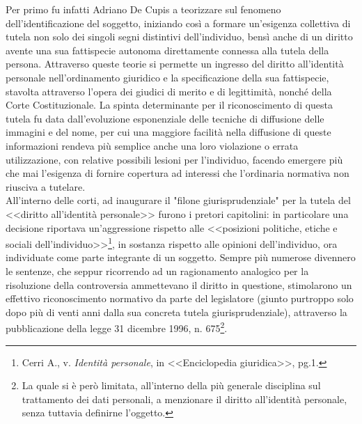 Per primo fu infatti Adriano De Cupis a teorizzare sul fenomeno dell'identificazione del soggetto, iniziando così a formare un’esigenza collettiva di tutela non solo dei singoli segni distintivi dell'individuo, bensì anche di un diritto avente una sua fattispecie autonoma direttamente connessa alla tutela della persona. Attraverso queste teorie si permette un ingresso del diritto all’identità personale nell’ordinamento giuridico e la specificazione della sua fattispecie, stavolta attraverso l’opera dei giudici di merito e di legittimità, nonché della Corte Costituzionale. 
La spinta determinante per il riconoscimento di questa tutela fu data dall’evoluzione esponenziale delle tecniche di diffusione  delle immagini e del nome, per cui una maggiore facilità nella diffusione di queste informazioni rendeva più semplice anche una loro violazione o errata utilizzazione, con relative possibili lesioni per l'individuo, facendo emergere più che mai l’esigenza di fornire copertura ad interessi che l’ordinaria normativa non riusciva a tutelare.
\\All'interno delle corti, ad inaugurare il "filone giurisprudenziale" per la tutela del <<diritto all'identità personale>> furono i pretori capitolini: in particolare una decisione riportava un'aggressione rispetto alle <<posizioni politiche, etiche e sociali dell'individuo>>\footnote{Cerri A., v. \textit{Identità personale}, in <<Enciclopedia giuridica>>, pg.1.}, in sostanza rispetto alle opinioni dell'individuo, ora individuate come parte integrante di un soggetto. Sempre più numerose divennero le sentenze, che seppur ricorrendo ad un ragionamento analogico per la risoluzione della controversia ammettevano il diritto in questione, stimolarono un effettivo riconoscimento normativo da parte del legislatore (giunto purtroppo solo dopo più di venti anni dalla sua concreta tutela giurisprudenziale), attraverso la pubblicazione della legge 31 dicembre 1996, n. 675\footnote{La quale si è però limitata, all’interno della più generale disciplina sul trattamento dei dati personali, a menzionare il diritto all’identità personale, senza tuttavia definirne l’oggetto.}.
